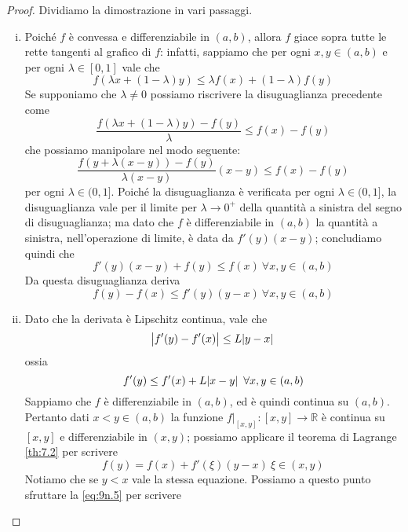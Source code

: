     \begin{proof}
        Dividiamo la dimostrazione in vari passaggi.
        \begin{enumerate}[(i)]
            \item Poiché $f$ è convessa e differenziabile in $(a,b)$, allora $f$ giace sopra tutte le rette tangenti al grafico di $f$: infatti, sappiamo che per ogni $x,y\in(a,b)$ e per ogni $\lambda\in[0,1]$ vale che
            \[
            f(\lambda x + (1-\lambda)y)\le \lambda f(x) + (1-\lambda)f(y)
            \]
            Se supponiamo che $\lambda \ne 0$ possiamo riscrivere la disuguaglianza precedente come
            \[
            \frac{f(\lambda x + (1-\lambda)y) - f(y)}{\lambda} \le f(x)-f(y)
            \]
            che possiamo manipolare nel modo seguente:
            \[
            \frac{f(y+\lambda(x-y)) - f(y)}{\lambda(x-y)}(x-y)\le f(x)-f(y)
            \]
            per ogni $\lambda \in(0,1]$. Poiché la disuguaglianza è verificata per ogni $\lambda\in(0,1]$, la disuguaglianza vale per il limite per $\lambda\to 0^+$ della quantità a sinistra del segno di disuguaglianza; ma dato che $f$ è differenziabile in $(a,b)$ la quantità a sinistra, nell'operazione di limite, è data da $f'(y)(x-y)$; concludiamo quindi che
            \[
            f'(y)(x-y) + f(y) \le f(x) \ \forall x,y\in(a,b)
            \]
            Da questa disuguaglianza deriva 
            \begin{equation}
                \label{eq:9n.4}
                f(y)-f(x)\le f'(y)(y-x) \ \forall x,y\in(a,b)
            \end{equation}
            \item Dato che la derivata è Lipschitz continua, vale che
            \[
            \abs{f'(y)-f'(x)}\le L \abs{y-x}
            \]
            ossia 
            \begin{equation}
                \label{eq:9n.5}
                f'(y)\le f'(x)+L \abs{x-y} \ \forall x,y\in(a,b)
            \end{equation}
            Sappiamo che $f$ è differenziabile in $(a,b)$, ed è quindi continua su $(a,b)$. Pertanto dati $x<y\in(a,b)$ la funzione $f|_{[x,y]}\colon [x,y]\to\mathbb{R}$ è continua su $[x,y]$ e differenziabile in $(x,y)$; possiamo applicare il teorema di Lagrange \ref{th:7.2} per scrivere
            \[
            f(y)= f(x) + f'(\xi)(y-x) \ \xi\in(x,y)
            \]
            Notiamo che se $y<x$ vale la stessa equazione. Possiamo a questo punto sfruttare la \eqref{eq:9n.5} per scrivere
            \begin{equation}

\end{equation}
\end{enumerate}
\end{proof}
